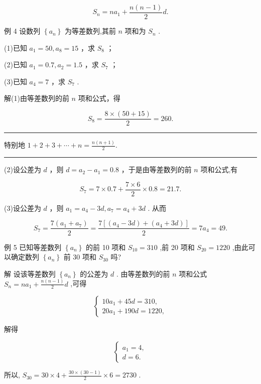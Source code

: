 \documentclass[10pt]{article}
\newcommand{\HRule}{\begin{center}\rule{0.9\linewidth}{0.2mm}\end{center}}
\begin{document}
\[
{S}_{n} = n{a}_{1} + \frac{n\left( {n - 1}\right) }{2}d.
\]

例 4 设数列 \(\left\{  {a}_{n}\right\}\) 为等差数列,其前 \(n\) 项和为 \({S}_{n}\) .

(1)已知 \({a}_{1} = {50},{a}_{8} = {15}\) ，求 \({S}_{8}\) ；

(2)已知 \({a}_{1} = {0.7},{a}_{2} = {1.5}\) ，求 \({S}_{7}\) ；

(3)已知 \({a}_{4} = 7\) ，求 \({S}_{7}\) .

解(1)由等差数列的前 \(n\) 项和公式，得

\[
{S}_{8} = \frac{8 \times  \left( {{50} + {15}}\right) }{2} = {260}.
\]

\HRule

特别地 \(1 + 2 + 3 + \cdots  + n = \frac{n\left( {n + 1}\right) }{2}.\)

\HRule

(2)设公差为 \(d\) ，则 \(d = {a}_{2} - {a}_{1} = {0.8}\) ，于是由等差数列的前 \(n\) 项和公式,有

\[
{S}_{7} = 7 \times  {0.7} + \frac{7 \times  6}{2} \times  {0.8} = {21.7}.
\]

(3)设公差为 \(d\) ，则 \({a}_{1} = {a}_{4} - {3d},{a}_{7} = {a}_{4} + {3d}\) . 从而

\[
{S}_{7} = \frac{7\left( {{a}_{1} + {a}_{7}}\right) }{2} = \frac{7\left\lbrack  {\left( {{a}_{4} - {3d}}\right)  + \left( {{a}_{4} + {3d}}\right) }\right\rbrack  }{2} = 7{a}_{4} = {49}.
\]

例 5 已知等差数列 \(\left\{  {a}_{n}\right\}\) 的前 10 项和 \({S}_{10} = {310}\) ,前 20 项和 \({S}_{20} = {1220}\) ,由此可以确定数列 \(\left\{  {a}_{n}\right\}\) 前 30 项和 \({S}_{30}\) 吗?

解 设该等差数列 \(\left\{  {a}_{n}\right\}\) 的公差为 \(d\) . 由等差数列的前 \(n\) 项和公式 \({S}_{n} = n{a}_{1} + \frac{n\left( {n - 1}\right) }{2}d\) ,可得

\[
\left\{  \begin{array}{l} {10}{a}_{1} + {45d} = {310}, \\  {20}{a}_{1} + {190d} = {1220}, \end{array}\right.
\]

解得

\[
\left\{  \begin{array}{l} {a}_{1} = 4, \\  d = 6. \end{array}\right.
\]

所以, \({S}_{30} = {30} \times  4 + \frac{{30} \times  \left( {{30} - 1}\right) }{2} \times  6 = {2730}\) .
\end{document}
